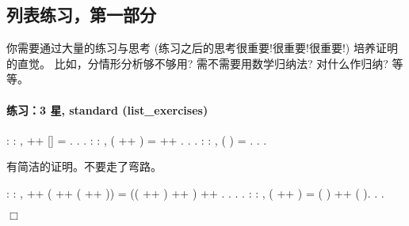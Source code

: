 \documentclass[12pt]{report}
\begin{document}
{{{\subsection{列表练习，第一部分}





  你需要通过大量的练习与思考 (练习之后的思考很重要!很重要!很重要!)
  培养证明的直觉。
  比如，分情形分析够不够用? 需不需要用数学归纳法? 对什么作归纳? 等等。
\paragraph{练习：3 星, standard (list\_exercises)}

\begin{coqdoccode}
\coqdocnoindent
{}  : \coqdockw{\ensuremath{\forall}}  : ,\coqdoceol
\coqdocindent{1.00em}
 ++ [] = .\coqdoceol
\coqdocnoindent
{}.\coqdoceol
\coqdocnoindent
{}.\coqdoceol
\coqdocemptyline
\coqdocnoindent
{} : \coqdockw{\ensuremath{\forall}}   : ,\coqdoceol
\coqdocindent{1.00em}
 ( ++ ) =   ++  .\coqdoceol
\coqdocnoindent
{}.\coqdoceol
\coqdocnoindent
{}.\coqdoceol
\coqdocemptyline
\coqdocnoindent
{}  : \coqdockw{\ensuremath{\forall}}  : ,\coqdoceol
\coqdocindent{1.00em}
 ( ) = .\coqdoceol
\coqdocnoindent
{}.\coqdoceol
\coqdocnoindent
{}.\coqdoceol
\coqdocemptyline
\end{coqdoccode}
 有简洁的证明。不要走了弯路。\begin{coqdoccode}
\coqdocemptyline
\coqdocnoindent
{}  : \coqdockw{\ensuremath{\forall}}     : ,\coqdoceol
\coqdocindent{1.00em}
 ++ ( ++ ( ++ )) = (( ++ ) ++ ) ++ .\coqdoceol
\coqdocnoindent
{}.\coqdoceol
\coqdocnoindent
{}.\coqdoceol
\coqdocemptyline
\coqdocnoindent
{} . \coqdocnoindent
{}  : \coqdockw{\ensuremath{\forall}}   : ,\coqdoceol
\coqdocindent{1.00em}
 ( ++ ) = ( ) ++ ( ).\coqdoceol
\coqdocnoindent
{}.\coqdoceol
\coqdocnoindent
{}.\coqdoceol
\end{coqdoccode}
\ensuremath{\Box} 

}}}
\end{document}

